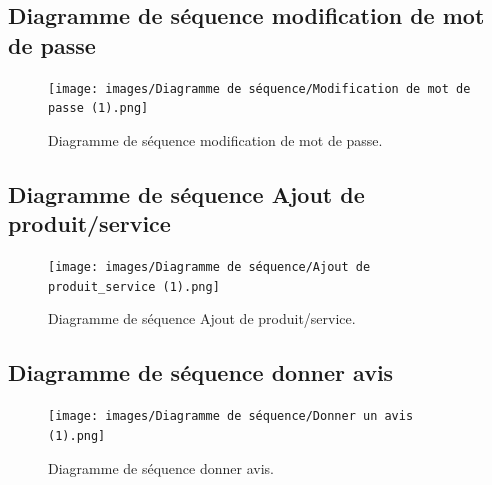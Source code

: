 \subsection{Diagramme de séquence modification de mot de passe }
\begin{figure}[H]
\centering
\texttt{[image: images/Diagramme de séquence/Modification de mot de
passe (1).png]}
\caption{Diagramme de séquence modification de mot de passe.}
\label{fig:my_label}
\end{figure}

\subsection{Diagramme de séquence Ajout de produit/service }
\begin{figure}[H]
\centering
\texttt{[image: images/Diagramme de séquence/Ajout de
produit\_service (1).png]}
\caption{Diagramme de séquence Ajout de produit/service.}
\label{fig:my_label}
\end{figure}

\subsection{Diagramme de séquence donner avis }
\begin{figure}[H]
\centering
\texttt{[image: images/Diagramme de séquence/Donner un avis
(1).png]}
\caption{Diagramme de séquence donner avis.}
\label{fig:my_label}
\end{figure}